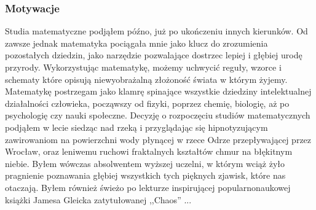 \documentclass[licencjacka]{pwr_wmat_praca_dyplomowa}
\theoremstyle{plain}
\numberwithin{theorem}{chapter}
\theoremstyle{definition}
\numberwithin{theorem}{chapter}
\begin{document}
\subsubsection{Motywacje}
Studia matematyczne podjąłem późno, już po ukończeniu innych kierunków. Od zawsze jednak matematyka pociągała mnie jako klucz do zrozumienia pozostałych dziedzin, jako narzędzie pozwalające dostrzec lepiej i głębiej urodę przyrody. Wykorzystując matematykę, możemy uchwycić reguły, wzorce i schematy które opisują niewyobrażalną złożoność świata w którym żyjemy. Matematykę postrzegam jako klamrę spinające wszystkie dziedziny intelektualnej działalności człowieka, począwszy od fizyki, poprzez chemię, biologię, aż po psychologię czy nauki społeczne. Decyzję o rozpoczęciu studiów matematycznych podjąłem w lecie siedząc nad rzeką i przyglądając się hipnotyzującym zawirowaniom na powierzchni wody płynącej w rzece Odrze przepływającej przez Wrocław, oraz leniwemu ruchowi fraktalnych kształtów chmur na błękitnym niebie. Byłem wówczas absolwentem wyższej uczelni, w którym wciąż żyło pragnienie poznawania głębiej wszystkich tych pięknych zjawisk, które nas otaczają. Byłem również świeżo po lekturze inspirującej popularnonaukowej książki Jamesa Gleicka zatytułowanej ,,Chaos'' \cite{gleick1987chaos}...
\end{document}
